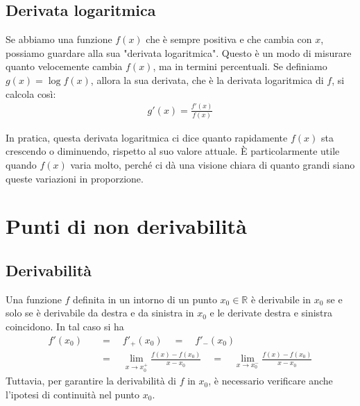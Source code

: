 \documentclass{book}
\begin{document}
\begin{definition}
    \subsection{Derivata logaritmica}
    Se abbiamo una funzione \( f(x) \) che è sempre positiva e che cambia con \( x \), possiamo guardare alla sua "derivata logaritmica". Questo è un modo di misurare quanto velocemente cambia \( f(x) \), ma in termini percentuali. Se definiamo \( g(x) = \log f(x) \), allora la sua derivata, che è la derivata logaritmica di \( f \), si calcola così:
    \begin{align*}
        g'(x) = \frac{f'(x)}{f(x)}
    \end{align*}

    In pratica, questa derivata logaritmica ci dice quanto rapidamente \( f(x) \) sta crescendo o diminuendo, rispetto al suo valore attuale. È particolarmente utile quando \( f(x) \) varia molto, perché ci dà una visione chiara di quanto grandi siano queste variazioni in proporzione.
\end{definition}

\section{Punti di non derivabilità}
\begin{definition}
    \subsection{Derivabilità}
    Una funzione \( f \) definita in un intorno di un punto \( x_0 \in \mathbb{R} \)
    è derivabile in \( x_0 \) se e solo se è derivabile da destra e da sinistra in \( x_0 \) e le
    derivate destra e sinistra coincidono. In tal caso si ha
    \begin{align*}
        f'(x_0) & \quad = \quad f'_+(x_0) \quad = \quad f'_-(x_0)                                                                               \\
                & \quad=  \quad \lim_{x \to x_0^+} \frac{f(x) - f(x_0)}{x - x_0} \quad = \quad \lim_{x \to x_0^-} \frac{f(x) - f(x_0)}{x - x_0}
    \end{align*}
    Tuttavia, per garantire la derivabilità di \( f \) in \( x_0 \), è necessario verificare anche l'ipotesi di continuità nel punto \( x_0 \).
\end{definition}
\end{document}
